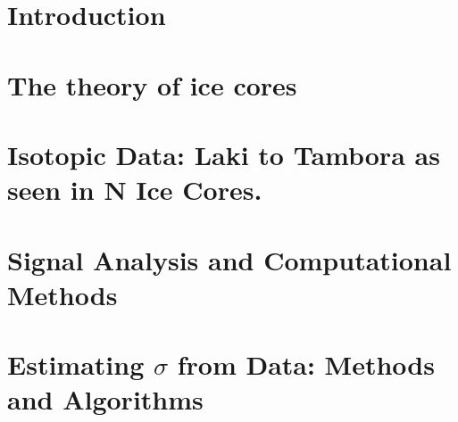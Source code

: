 \documentclass[11pt]{memoir} %
\begin{document}
\newpage

\listoftodos

\tableofcontents*{}


\newpage
\listoffigures

\listoftables

\lstlistoflistings


\mainmatter

\chapter[Introduction][Introduction]{Introduction}




\chapter[Ice Theory][Ice Theory]{The theory of ice cores}




\chapter[Data][Data]{Isotopic Data: Laki to Tambora as seen in N Ice Cores.}





\chapter[Signal Analysis \& Comp. Meth.][Signal Analysis \& Comp. Meth.]{Signal Analysis and Computational Methods}





%


\chapter[Method][Method]{Estimating $\sigma$ from Data: Methods and Algorithms}


\end{document}
